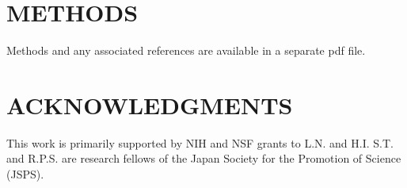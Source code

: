 \documentclass[twoside,twocolumn, letterpaper]{article}
\begin{document}








\section*{METHODS}
Methods and any associated references are available in a separate pdf file.

\section*{ACKNOWLEDGMENTS}
This work is primarily supported by NIH and NSF grants to L.N. and H.I. S.T. and R.P.S. are research fellows of the Japan Society for the Promotion of Science (JSPS).
\end{document}
